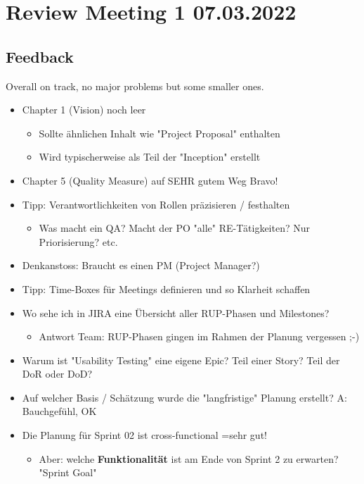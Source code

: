 \section{Review Meeting 1 07.03.2022}

\subsection{Feedback}
Overall on track, no major problems but some smaller ones.

\begin{itemize}
    \item Chapter 1 (Vision) noch leer
    \begin{itemize}
        \item Sollte ähnlichen Inhalt wie "Project Proposal" enthalten
        \item Wird typischerweise als Teil der "Inception" erstellt
    \end{itemize}
    \item Chapter 5 (Quality Measure) auf SEHR gutem Weg \textrightarrow Bravo!
    \item Tipp: Verantwortlichkeiten von Rollen präzisieren / festhalten
    \begin{itemize}
        \item Was macht ein QA? Macht der PO "alle" RE-Tätigkeiten? Nur Priorisierung? etc.
    \end{itemize}
    \item Denkanstoss: Braucht es einen PM (Project Manager?)
    \item Tipp: Time-Boxes für Meetings definieren und so Klarheit schaffen
    \item Wo sehe ich in JIRA eine Übersicht aller RUP-Phasen und Milestones?
    \begin{itemize}
        \item Antwort Team: RUP-Phasen gingen im Rahmen der Planung vergessen ;-)
    \end{itemize}
    \item Warum ist "Usability Testing" eine eigene Epic? Teil einer Story? Teil der DoR oder DoD?
    \item Auf welcher Basis / Schätzung wurde die "langfristige" Planung erstellt? \textrightarrow A: Bauchgefühl, OK
    \item Die Planung für Sprint 02 ist cross-functional =\textrightarrow sehr gut!
    \begin{itemize}
        \item Aber: welche \textbf{Funktionalität} ist am Ende von Sprint 2 zu erwarten? \textrightarrow "Sprint Goal"

\end{itemize}
\end{itemize}
